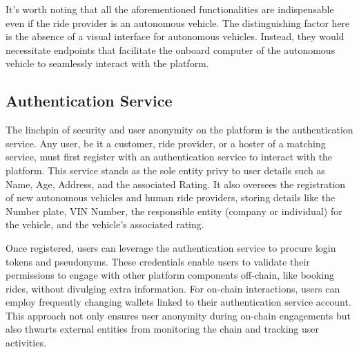 It's worth noting that all the aforementioned functionalities are indispensable even if the ride provider is an autonomous vehicle. The distinguishing factor here is the absence of a visual interface for autonomous vehicles. Instead, they would necessitate endpoints that facilitate the onboard computer of the autonomous vehicle to seamlessly interact with the platform.

\subsection{Authentication Service}

The linchpin of security and user anonymity on the platform is the authentication service. Any user, be it a customer, ride provider, or a hoster of a matching service, must first register with an authentication service to interact with the platform. This service stands as the sole entity privy to user details such as Name, Age, Address, and the associated Rating. It also oversees the registration of new autonomous vehicles and human ride providers, storing details like the Number plate, VIN Number, the responsible entity (company or individual) for the vehicle, and the vehicle's associated rating.

Once registered, users can leverage the authentication service to procure login tokens and pseudonyms. These credentials enable users to validate their permissions to engage with other platform components off-chain, like booking rides, without divulging extra information. For on-chain interactions, users can employ frequently changing wallets linked to their authentication service account. This approach not only ensures user anonymity during on-chain engagements but also thwarts external entities from monitoring the chain and tracking user activities.

